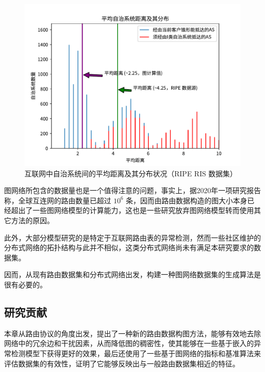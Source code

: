 \begin{figure}[h]
    \includegraphics[width=0.85\linewidth]{chapter/c3_images/c3_as-distance.pdf}
    \caption{互联网中自治系统间的平均距离及其分布状况（RIPE RIS 数据集）}
    \label{c3_as-distance}
\end{figure}

图网络所包含的数据量也是一个值得注意的问题，事实上，据2020年一项研究报告称，全球互连网的路由数量已超过 $10^6$ 条，因而由路由数据构造的图大小本身已经超出了一些图网络模型的计算能力，这也是一些研究放弃图网络模型转而使用其它方法的原因。

此外，大部分模型研究的是特定于互联网路由表的异常检测，然而一些社区维护的分布式网络的拓扑结构与此并不相似，这类分布式网络尚未有满足本研究要求的数据集。

因而，从现有路由数据集和分布式网络出发，构建一种图网络数据集的生成算法是很有必要的。

\subsection{研究贡献}

本章从路由协议的角度出发，提出了一种新的路由数据构图方法，能够有效地去除网络中的冗余边和干扰因素，从而降低图的稠密性，使其能够在一些基于嵌入的异常检测模型下获得更好的效果，最后还使用了一些基于图网络的指标和基准算法来评估数据集的有效性，证明了它能够反映出与一般路由数据集相近的特征。